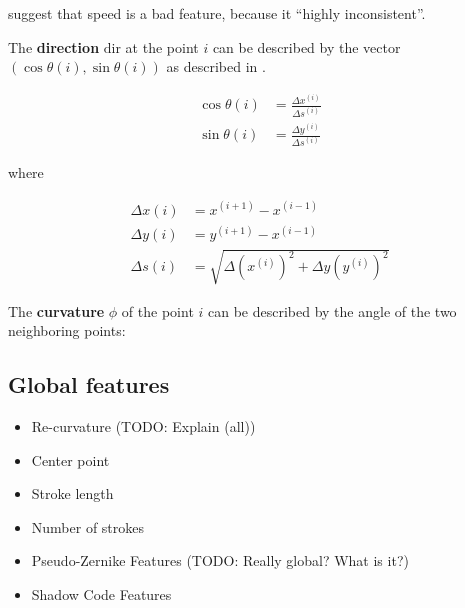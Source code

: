 \cite{Kosmala98,Kosmala11} suggest that speed is a bad feature, because it \enquote{highly inconsistent}.

The \textbf{direction} $\text{dir}$ at the point $i$ can be described by the vector 
$(\cos \theta(i), \sin \theta(i))$ as described in \cite{Guyon91}.

\begin{align}
    \cos \theta(i) &= \frac{\Delta x^{(i)}}{\Delta s^{(i)}}\\
    \sin \theta(i) &= \frac{\Delta y^{(i)}}{\Delta s^{(i)}}
\end{align}

where

\begin{align}
    \Delta x (i) &= x^{(i+1)} - x^{(i-1)}\\
    \Delta y (i) &= y^{(i+1)} - x^{(i-1)}\\
    \Delta s (i) &= \sqrt{\Delta (x^{(i)})^2 + \Delta y (y^{(i)})^2}
\end{align}

The \textbf{curvature} $\phi$ of the point $i$ can be described by the
angle of the two neighboring points:


\subsection{Global features}
\begin{itemize}
    \item Re-curvature\cite{Huang06} (TODO: Explain (all))
    \item Center point\cite{Huang06}
    \item Stroke length\cite{Huang06}
    \item Number of strokes\cite{Huang09}
    \item Pseudo-Zernike Features (TODO: Really global? What is it?)\cite{Khotanzad}
    \item Shadow Code Features\cite{Khotanzad}
\end{itemize}